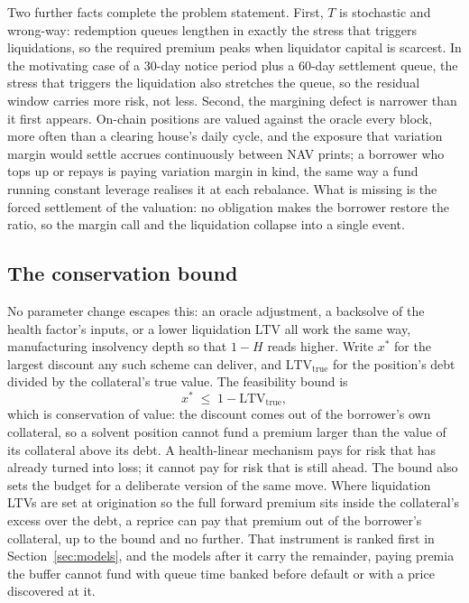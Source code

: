 \documentclass[11pt,a4paper]{article}
\begin{document}
Two further facts complete the problem statement. First, $T$ is stochastic and wrong-way: redemption queues lengthen in exactly the stress that triggers liquidations, so the required premium peaks when liquidator capital is scarcest. In the motivating case of a 30-day notice period plus a 60-day settlement queue, the stress that triggers the liquidation also stretches the queue, so the residual window carries more risk, not less. Second, the margining defect is narrower than it first appears. On-chain positions are valued against the oracle every block, more often than a clearing house's daily cycle, and the exposure that variation margin would settle accrues continuously between NAV prints; a borrower who tops up or repays is paying variation margin in kind, the same way a fund running constant leverage realises it at each rebalance. What is missing is the forced settlement of the valuation: no obligation makes the borrower restore the ratio, so the margin call and the liquidation collapse into a single event.

\subsection{The conservation bound}

No parameter change escapes this: an oracle adjustment, a backsolve of the health factor's inputs, or a lower liquidation LTV all work the same way, manufacturing insolvency depth so that $1-H$ reads higher. Write $x^*$ for the largest discount any such scheme can deliver, and $\mathrm{LTV}_{\text{true}}$ for the position's debt divided by the collateral's true value. The feasibility bound is
\[
x^* \;\le\; 1 - \mathrm{LTV}_{\text{true}},
\]
which is conservation of value: the discount comes out of the borrower's own collateral, so a solvent position cannot fund a premium larger than the value of its collateral above its debt. A health-linear mechanism pays for risk that has already turned into loss; it cannot pay for risk that is still ahead. The bound also sets the budget for a deliberate version of the same move. Where liquidation LTVs are set at origination so the full forward premium sits inside the collateral's excess over the debt, a reprice can pay that premium out of the borrower's collateral, up to the bound and no further. That instrument is ranked first in Section~\ref{sec:models}, and the models after it carry the remainder, paying premia the buffer cannot fund with queue time banked before default or with a price discovered at it.
\end{document}
